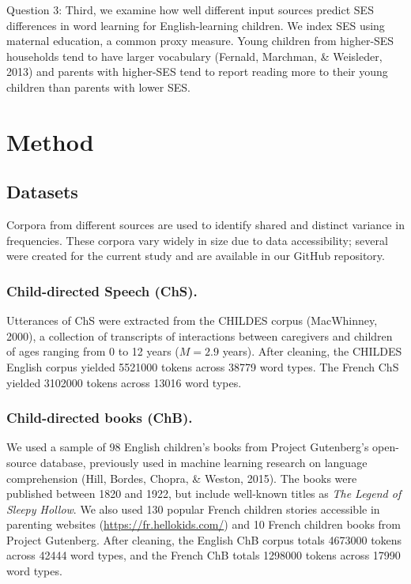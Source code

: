 \documentclass[10pt, letterpaper]{article}
\begin{document}
Question 3: Third, we examine how well different input sources predict
SES differences in word learning for English-learning children. We index
SES using maternal education, a common proxy measure. Young children
from higher-SES households tend to have larger vocabulary (Fernald,
Marchman, \& Weisleder, 2013) and parents with higher-SES tend to report
reading more to their young children than parents with lower SES.

\hypertarget{method}{%
\section{Method}\label{method}}

\hypertarget{datasets}{%
\subsection{Datasets}\label{datasets}}

Corpora from different sources are used to identify shared and distinct
variance in frequencies. These corpora vary widely in size due to data
accessibility; several were created for the current study and are
available in our GitHub repository.

\hypertarget{child-directed-speech-chs.}{%
\subsubsection{Child-directed Speech
(ChS).}\label{child-directed-speech-chs.}}

Utterances of ChS were extracted from the CHILDES corpus (MacWhinney,
2000), a collection of transcripts of interactions between caregivers
and children of ages ranging from 0 to 12 years (\(M=2.9\) years). After
cleaning, the CHILDES English corpus yielded 5521000 tokens across 38779
word types. The French ChS yielded 3102000 tokens across 13016 word
types.

\hypertarget{child-directed-books-chb.}{%
\subsubsection{Child-directed books
(ChB).}\label{child-directed-books-chb.}}

We used a sample of 98 English children's books from Project Gutenberg's
open-source database, previously used in machine learning research on
language comprehension (Hill, Bordes, Chopra, \& Weston, 2015). The
books were published between 1820 and 1922, but include well-known
titles as \emph{The Legend of Sleepy Hollow}. We also used 130 popular
French children stories accessible in parenting websites
(\url{https://fr.hellokids.com/}) and 10 French children books from
Project Gutenberg. After cleaning, the English ChB corpus totals 4673000
tokens across 42444 word types, and the French ChB totals 1298000 tokens
across 17990 word types.
\end{document}
